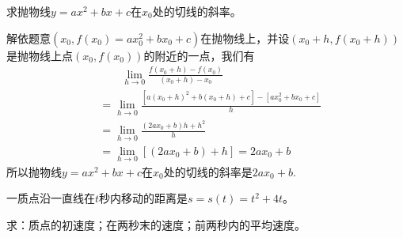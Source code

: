 \begin{example}
    求抛物线$y=ax^2+bx+c$在$x_0$处的切线的斜率。
\end{example}

\begin{solution}
    解依题意$(x_0,f(x_0)=ax_0^2+bx_0+c)$在抛物线上，并设$(x_0+h,f(x_0+h))$是抛物线上点$(x_0,f(x_0))$的附近的一点，我们有
\[\begin{split}
&\qquad \lim_{h\to 0}\frac{f(x_0+h)-f(x_0)}{(x_0+h)-x_0}\\
&=\lim_{h\to 0}\frac{[a(x_0+h)^2+b(x_0+h)+c]-[ax^2_0+bx_0+c]}{h}    \\
&=\lim_{h\to 0}\frac{(2ax_0+b)h+h^2}{h}\\
&=\lim_{h\to 0}[(2ax_0+b)+h]=2ax_0+b
\end{split}\]
所以抛物线$y=ax^2+bx+c$在$x_0$处的切线的斜率是$2ax_0+b$.
\end{solution}

\begin{example}
    一质点沿一直线在$t$秒内移动的距离是$s=s(t)=t^2+4t$。
    
    求：质点的初速度；在两秒末的速度；前两秒内的平均速度。
\end{example}

